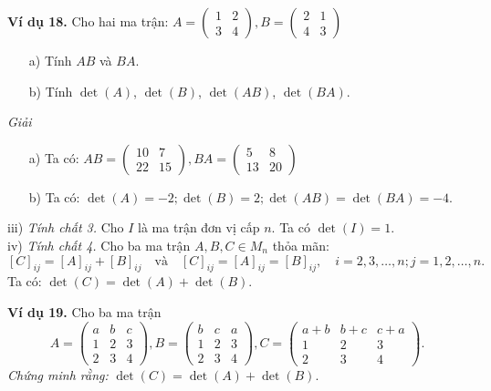 \textbf{Ví dụ 18.} Cho hai ma trận: \( A = \begin{pmatrix}
1 & 2 \\
3 & 4
\end{pmatrix}, B = \begin{pmatrix}
2 & 1 \\
4 & 3
\end{pmatrix} \)
\begin{itemize}
    \item[a)] Tính \( AB \) và \( BA \).
    \item[b)] Tính \(\det(A)\), \(\det(B)\), \(\det(AB)\), \(\det(BA)\).
\end{itemize}

\textit{Giải}
\begin{itemize}
    \item[a)] Ta có: \( AB = \begin{pmatrix}
    10 & 7 \\
    22 & 15
    \end{pmatrix}, BA = \begin{pmatrix}
    5 & 8 \\
    13 & 20
    \end{pmatrix} \)
    \item[b)] Ta có: \(\det(A) = -2; \det(B) = 2; \det(AB) = \det(BA) = -4\).
\end{itemize}
iii) \textit{Tính chất 3.} Cho \(I\) là ma trận đơn vị cấp \(n\). Ta có \(\det(I) = 1\).\\
iv) \textit{Tính chất 4.} Cho ba ma trận \(A, B, C \in M_n\) thỏa mãn:
\[
[C]_{ij} = [A]_{ij} + [B]_{ij} \quad \text{và} \quad [C]_{ij} = [A]_{ij} = [B]_{ij}, \quad i = 2, 3, \ldots, n; j = 1, 2, \ldots, n.
\]
Ta có: \(\det(C) = \det(A) + \det(B)\).

\textbf{Ví dụ 19.} Cho ba ma trận
\[
A = \begin{pmatrix}
a & b & c \\
1 & 2 & 3 \\
2 & 3 & 4
\end{pmatrix},
B = \begin{pmatrix}
b & c & a \\
1 & 2 & 3 \\
2 & 3 & 4
\end{pmatrix},
C = \begin{pmatrix}
a + b & b + c & c + a \\
1 & 2 & 3 \\
2 & 3 & 4
\end{pmatrix}.
\]
\textit{Chứng minh rằng:} \(\det(C) = \det(A) + \det(B)\).

